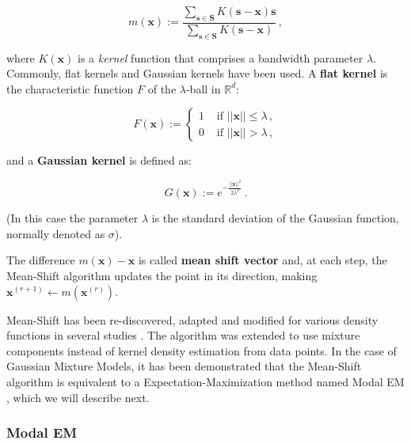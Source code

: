 \begin{equation}
  m\left(\mathbf{x}\right) := \frac{
    \sum_{\mathbf{s} \in \mathbf{S}} K\left(\mathbf{s}-\mathbf{x}\right) \mathbf{s}
  }{
    \sum_{\mathbf{s} \in \mathbf{S}} K\left(\mathbf{s}-\mathbf{x}\right)
  } \, ,
\end{equation}

\noindent where $K(\mathbf{x})$ is a \emph{kernel} function that comprises a bandwidth parameter $\lambda$. Commonly, flat kernels and Gaussian kernels have been used. A \textbf{flat kernel} is the characteristic function $F$ of the $\lambda$-ball in $\mathbb{R}^d$:

\begin{equation}
  F(\mathbf{x}) := \begin{cases}
    1 & \text{ if } ||\mathbf{x}|| \leq \lambda \, , \\
    0 & \text{ if } ||\mathbf{x}|| > \lambda \, ,
  \end{cases}
\end{equation}

\noindent and a \textbf{Gaussian kernel} is defined as:

\begin{equation}
  G(\mathbf{x}) := e^{-\frac{||\mathbf{x}||^2}{2\lambda^2}} \, .
\end{equation}

\noindent (In this case the parameter $\lambda$ is the standard deviation of the Gaussian function, normally denoted as $\sigma$).

The difference $m(\mathbf{x}) - \mathbf{x}$ is called \textbf{mean shift vector} and, at each step, the Mean-Shift algorithm updates the point in its direction, making $\mathbf{x}^{(r+1)} \leftarrow m\left(\mathbf{x}^{(r)}\right)$.

Mean-Shift has been re-discovered, adapted and modified for various density functions in several studies \citep{Cheng1995, Carreira-Perpinan2000, Comaniciu2002}. The algorithm was extended to use mixture components instead of kernel density estimation from data points. In the case of Gaussian Mixture Models, it has been demonstrated that the Mean-Shift algorithm is equivalent to a Expectation-Maximization method named Modal EM \citep{Carreira-Perpinan2007, Chacon2019}, which we will describe next.

\subsubsection{Modal EM}

